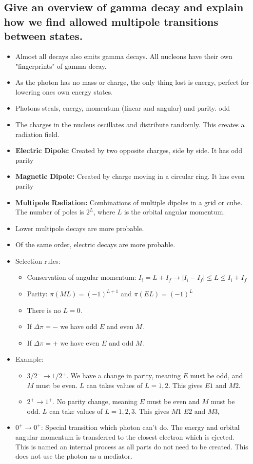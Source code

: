 \documentclass{article}
\begin{document}
\subsection{Give an overview of gamma decay and explain how we find allowed multipole transitions between states.}
\begin{itemize}
    \item Almost all decays also emits gamma decays. All nucleons have their own "fingerprints" of gamma decay. 
    \item As the photon has no mass or charge, the only thing lost is energy, perfect for lowering ones own energy states. 
    \item Photons steals, energy, momentum (linear and angular) and parity.  odd
    \item The charges in the nucleus oscillates and distribute randomly. This creates a radiation field. 
    \item \textbf{Electric Dipole:} Created by two opposite charges, side by side. It has odd parity 
    \item \textbf{Magnetic Dipole:} Created by charge moving in a circular ring. It has even parity
    \item \textbf{Multipole Radiation:} Combinations of multiple dipoles in a grid or cube. The number of poles is $2^{L}$, where $L$ is the orbital angular momentum.  
    \item Lower multipole decays are more probable. 
    \item Of the same order, electric decays are more probable.  
    \item Selection rules: 
    \begin{itemize}
        \item Conservation of angular momentum: $I_i = L + I_f → \left|I_i - I_f\right| ≤ L ≤ I_i + I_f$
        \item Parity: $π(ML) = (-1)^{L+1}$ and $π(EL) = (-1)^{L}$
        \item There is no $L = 0$.
        \item If $Δπ = -$ we have odd $E$ and even $M$. 
        \item If $Δπ = +$ we have even $E$ and odd $M$.  
    \end{itemize} 
    \item Example: 
    \begin{itemize}
        \item $3/2^{-} → 1/2^{+}$. We have a change in parity, meaning $E$ must be odd, and $M$ must be even. $L$ can takes values of $L=1,2$. This gives $E1$ and $M2$. 
        \item $2^{+} → 1^{+}$. No parity change, meaning $E$ must be even and $M$ must be odd. $L$ can take values of $L=1,2,3$. This gives $M1$ $E2$ and $M3$,  
    \end{itemize} 
    \item $0^{+} → 0^{+}$: Special transition which photon can't do. The energy and orbital angular momentum is transferred to the closest electron which is ejected. This is named an internal process as all parts do not need to be created. This does not use the photon as a mediator. 
\end{itemize}
\end{document}
